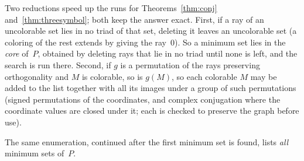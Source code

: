 Two reductions speed up the runs for Theorems~\ref{thm:conj} and~\ref{thm:threesymbol}; both
keep the answer exact.  First, if a ray of an uncolorable set lies in no triad of that set,
deleting it leaves an uncolorable set (a coloring of the rest extends by giving the ray~0).  So a
minimum set lies in the \emph{core} of~$P$, obtained by deleting rays that lie in no triad
until none is left, and the search is run there.  Second, if
$g$ is a permutation of the rays preserving orthogonality and $M$ is colorable, so is $g(M)$, so
each colorable $M$ may be added to the list together with all its images under a group of such
permutations (signed permutations of the coordinates, and complex conjugation where the
coordinate values are closed under it; each is checked to preserve the graph before use).

The same enumeration, continued after the first
minimum set is found, lists \emph{all} minimum sets of~$P$.

